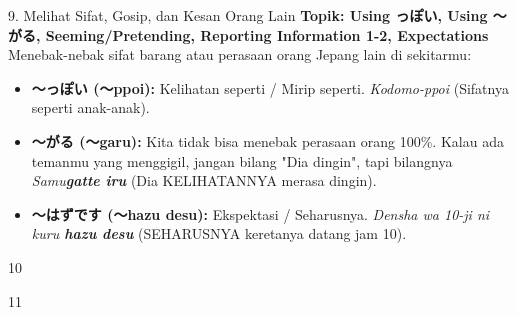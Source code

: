 \begin{lessonbox}{9. Melihat Sifat, Gosip, dan Kesan Orang Lain}
    \textbf{Topik: Using っぽい, Using ～がる, Seeming/Pretending, Reporting Information 1-2, Expectations} \\
    Menebak-nebak sifat barang atau perasaan orang Jepang lain di sekitarmu:
    \begin{itemize}
        \item \textbf{〜っぽい (〜ppoi):} Kelihatan seperti / Mirip seperti. \textit{Kodomo-ppoi} (Sifatnya seperti anak-anak).
        \item \textbf{〜がる (〜garu):} Kita tidak bisa menebak perasaan orang 100\%. Kalau ada temanmu yang menggigil, jangan bilang "Dia dingin", tapi bilangnya \textit{Samu\textbf{gatte iru}} (Dia KELIHATANNYA merasa dingin).
        \item \textbf{〜はずです (〜hazu desu):} Ekspektasi / Seharusnya. \textit{Densha wa 10-ji ni kuru \textbf{hazu desu}} (SEHARUSNYA keretanya datang jam 10).
    \end{itemize}
\end{lessonbox}

\begin{convobox}{10}
    \noindent
       

    \vspace{1.5em}
\end{convobox}

\begin{convobox}{11}
    \noindent
      
      
     

    \vspace{1.5em}
\end{convobox}

